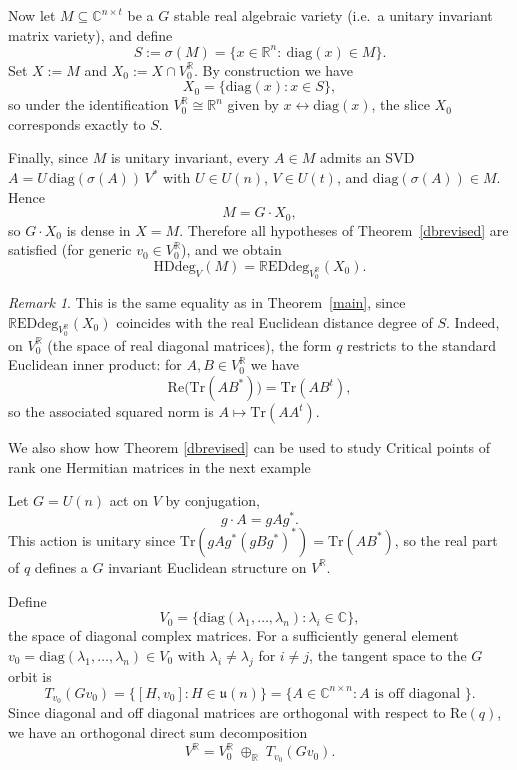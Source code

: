 \documentclass[11pt]{amsart}
\def\R{\mathbb R}\let\er\R
\theoremstyle{plain}
\theoremstyle{definition}
\theoremstyle{remark}
\newtheorem{remark}[theorem]{Remark}
\begin{document}
Now let $M\subseteq \mathbb{C}^{n\times t}$ be a $G$ stable real algebraic variety (i.e.\ a
unitary invariant matrix variety), and define
\[
S:=\sigma(M)=\{x\in \mathbb{R}^{n}:\ \mathrm{diag}(x)\in M\}.
\]
Set $X:=M$ and $X_{0}:=X\cap V_{0}^{\mathbb{R}}$. By construction we have
\[
X_{0}=\{\mathrm{diag}(x): x\in S\},
\]
so under the identification $V_{0}^{\mathbb{R}}\cong \mathbb{R}^{n}$ given by
$x\leftrightarrow \mathrm{diag}(x)$, the slice $X_{0}$ corresponds exactly to $S$.

Finally, since $M$ is unitary invariant, every $A\in M$ admits an SVD
$A=U\,\mathrm{diag}(\sigma(A))\,V^{*}$ with $U\in U(n)$, $V\in U(t)$, and
$\mathrm{diag}(\sigma(A))\in M$. Hence
\[
M = G\cdot X_{0},
\]
so $G\cdot X_{0}$ is dense in $X=M$. Therefore all hypotheses of
Theorem~\ref{dbrevised} are satisfied (for generic $v_{0}\in V_{0}^{\mathbb{R}}$), and we obtain
\[
\mathrm{HDdeg}_{V}(M)=\mathrm{\mathbb{R}EDdeg}_{V_{0}^{\mathbb{R}}}(X_{0}).
\]
\begin{remark}
This is the same equality as in Theorem~\ref{main}, since
$\mathrm{\mathbb{R}EDdeg}_{V_{0}^{\mathbb{R}}}(X_{0})$ coincides with the real Euclidean distance degree of $S$.
Indeed, on $V_{0}^{\mathbb{R}}$ (the space of real diagonal matrices), the form $q$ restricts to the standard Euclidean inner product:
for $A,B\in V_{0}^{\mathbb{R}}$ we have
\[
\mathrm{Re}\!\big(\mathrm{Tr}(AB^{*})\big)=\mathrm{Tr}(AB^{t}),
\]
so the associated squared norm is $A\mapsto \mathrm{Tr}(AA^{t})$.
\end{remark}
We also show how Theorem \ref{dbrevised} can be used to study Critical points of rank one Hermitian matrices in the next example




Let $G = U(n)$ act on $V$ by conjugation,
\[
g \cdot A = g A g^{\ast}.
\]
This action is unitary since
$\mathrm{Tr}(gAg^{\ast}(gBg^{\ast})^{\ast}) = \mathrm{Tr}(AB^{\ast})$,
so the real part of $q$ defines a $G$ invariant Euclidean structure on $V^{\mathbb{R}}$. 

Define 
\[
V_{0} = \{ \mathrm{diag}(\lambda_1,\dots,\lambda_n) : \lambda_i \in \mathbb{C} \},
\]
the space of diagonal complex matrices.  
For a sufficiently general element
$v_{0} = \mathrm{diag}(\lambda_1,\dots,\lambda_n) \in V_{0}$ with $\lambda_i \neq \lambda_j$ 
for $i \neq j$, the tangent space to the $G$ orbit is
\[
T_{v_0}(G v_0)
= \{ [H,v_0] : H \in \mathfrak{u}(n) \}
= \{ A \in \mathbb{C}^{n\times n} : A \text{ is off diagonal  } \}.
\]
Since diagonal and off diagonal matrices are orthogonal with respect to 
$\mathrm{Re}  (q)$, we have an orthogonal direct sum decomposition
\[
V^{\R} = V_0^\mathbb{R}  \;\oplus _\mathbb{R}\; T_{v_0}(G v_0).
\]
\end{document}
